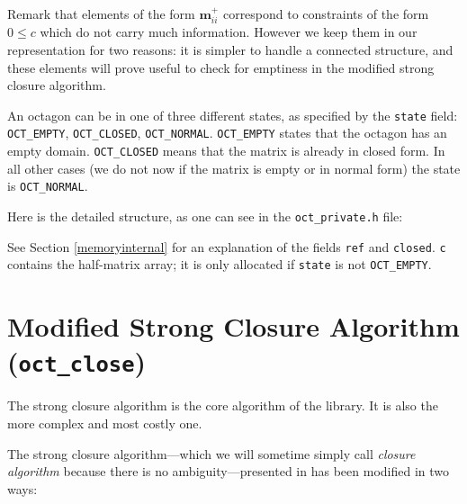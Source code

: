 \documentclass[twosides]{report}
\makeatletter
\newcommand{\findex}[1]{\index{#1@{\tt #1}}}
\renewcommand{\vec}[1]{{{\mathbf #1}}}
\makeatother
\begin{document}
Remark that elements of the form $\vec{m}^+_{ii}$ correspond to constraints
of the form $0\leq c$ which do not carry much information.
However we keep them in our representation for two reasons:
it is simpler to handle a connected structure, and these elements will prove
useful to check for emptiness in the modified strong closure algorithm.

An octagon can be in one of three different states, as specified by the 
{\tt state} field:
{\tt OCT\_EMPTY}, {\tt OCT\_CLOSED}, {\tt OCT\_NORMAL}.
{\tt OCT\_EMPTY} states that the octagon has an empty domain.
{\tt OCT\_CLOSED} means that the matrix is already in closed form.
In all other cases (we do not now if the matrix is empty or in
normal form) the state is {\tt OCT\_NORMAL}.

Here is the detailed structure, as one can see in the {\tt oct\_private.h}
file:

\findex{oct\_tt}
\quad{}

See Section \ref{memoryinternal} for an explanation of the fields
{\tt ref} and {\tt closed}.
{\tt c} contains the half-matrix array; it is only allocated if
{\tt state} is not {\tt OCT\_EMPTY}.

\section{Modified Strong Closure Algorithm ({\tt oct\_close})}
\label{closure}
The strong closure algorithm is the core algorithm of the library.
It is also the more complex and most costly one.

The strong closure algorithm---which we will sometime simply call {\em closure
algorithm\/} because there is no ambiguity---presented in 
\cite{mine:ast01} has been modified in two ways:
\end{document}
